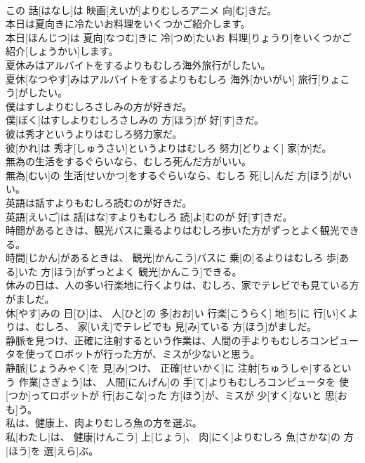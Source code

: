 \documentclass[8pt]{extreport}
\begin{document}
\begin{CJK}{UTF8}{min}
\\	この 話[はなし]は 映画[えいが]よりむしろアニメ 向[む]きだ。
\\	本日は夏向きに冷たいお料理をいくつかご紹介します。	
\\	本日[ほんじつ]は 夏向[なつむ]きに 冷[つめ]たいお 料理[りょうり]をいくつかご 紹介[しょうかい]します。
\\	夏休みはアルバイトをするよりもむしろ海外旅行がしたい。	
\\	夏休[なつやす]みはアルバイトをするよりもむしろ 海外[かいがい] 旅行[りょこう]がしたい。
\\	僕はすしよりむしろさしみの方が好きだ。	
\\	僕[ぼく]はすしよりむしろさしみの 方[ほう]が 好[す]きだ。
\\	彼は秀才というよりはむしろ努力家だ。	
\\	彼[かれ]は 秀才[しゅうさい]というよりはむしろ 努力[どりょく] 家[か]だ。
\\	無為の生活をするぐらいなら、むしろ死んだ方がいい。	
\\	無為[むい]の 生活[せいかつ]をするぐらいなら、むしろ 死[し]んだ 方[ほう]がいい。
\\	英語は話すよりもむしろ読むのが好きだ。	
\\	英語[えいご]は 話[はな]すよりもむしろ 読[よ]むのが 好[す]きだ。
\\	時間があるときは、観光バスに乗るよりはむしろ歩いた方がずっとよく観光できる。	
\\	時間[じかん]があるときは、 観光[かんこう]バスに 乗[の]るよりはむしろ 歩[ある]いた 方[ほう]がずっとよく 観光[かんこう]できる。
\\	休みの日は、人の多い行楽地に行くよりは、むしろ、家でテレビでも見ている方がましだ。	
\\	休[やす]みの 日[ひ]は、 人[ひと]の 多[おお]い 行楽[こうらく] 地[ち]に 行[い]くよりは、むしろ、 家[いえ]でテレビでも 見[み]ている 方[ほう]がましだ。
\\	静脈を見つけ、正確に注射するという作業は、人間の手よりもむしろコンピュータを使ってロボットが行った方が、ミスが少ないと思う。	
\\	静脈[じょうみゃく]を 見[み]つけ、 正確[せいかく]に 注射[ちゅうしゃ]するという 作業[さぎょう]は、 人間[にんげん]の 手[て]よりもむしろコンピュータを 使[つか]ってロボットが 行[おこな]った 方[ほう]が、ミスが 少[すく]ないと 思[おも]う。
\\	私は、健康上、肉よりむしろ魚の方を選ぶ。	
\\	私[わたし]は、 健康[けんこう] 上[じょう]、 肉[にく]よりむしろ 魚[さかな]の 方[ほう]を 選[えら]ぶ。

\end{CJK}
\end{document}
